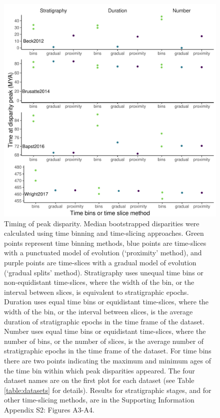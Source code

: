 \documentclass[12pt,a4paper]{article}
\begin{document}
\begin{figure}[!htbp]
    \centering
    \includegraphics[width=1\linewidth, height=1\textheight, keepaspectratio]{figures/Figure3-fig-peaks-epoch-revision.pdf}
    \caption[Timing of peak disparity for four example datasets.]
    {Timing of peak disparity.
    Median bootstrapped disparities were calculated using time binning and time-slicing approaches. 
    Green points represent time binning methods, blue points are time-slices with a punctuated model of evolution (`proximity' method), and purple points are time-slices with a gradual model of evolution (`gradual splits' method). 
    Stratigraphy uses unequal time bins or non-equidistant time-slices, where the width of the bin, or the interval between slices, is equivalent to stratigraphic epochs. 
    Duration uses equal time bins or equidistant time-slices, where the width of the bin, or the interval between slices, is the average duration of stratigraphic epochs in the time frame of the dataset. 
    Number uses equal time bins or equidistant time-slices, where the number of bins, or the number of slices, is the average number of stratigraphic epochs in the time frame of the dataset. 
    For time bins there are two points indicating the maximum and minimum ages of the time bin within which peak disparities appeared.
    The four dataset names are on the first plot for each dataset (see Table \ref{table:datasets} for details).
    Results for stratigraphic stages, and for other time-slicing methods, are in the Supporting Information Appendix S2: Figures A3-A4.}
    \label{figure:peak1}
\end{figure}
\end{document}
